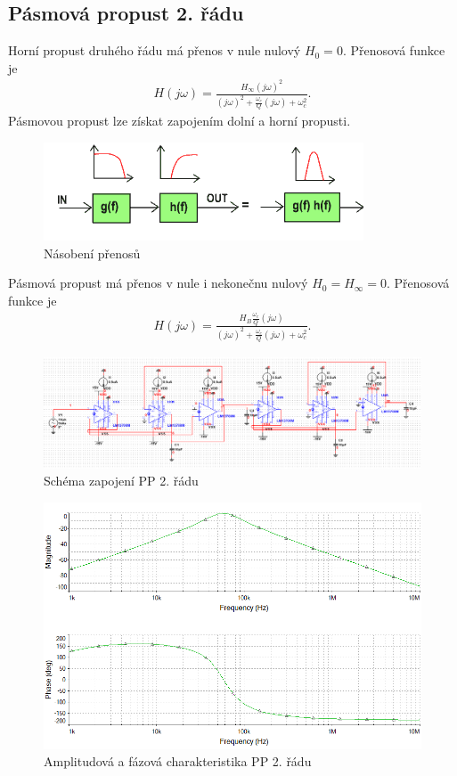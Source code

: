 \subsection{Pásmová propust 2. řádu}\label{s:PP2}
Horní propust druhého řádu má přenos v nule nulový $H_{0} = 0$. Přenosová funkce je
\begin{align}
H(j\omega) = \frac{H_{\infty} (j\omega) ^2}{(j\omega)^2 + \frac{\omega _c}{Q}(j\omega) + \omega _c ^2}.
\end{align}
\noindent Pásmovou propust lze získat zapojením dolní a horní propusti.
\begin{figure}[H]
\centering
\includegraphics[scale=0.9]{fig9.png}
\caption{Násobení přenosů \cite{13}}
\end{figure}
\noindent Pásmová propust má přenos v nule i nekonečnu nulový $H_{0} = H_{\infty} = 0$. Přenosová funkce je
\begin{align}
H(j\omega) = \frac{H_{B} \frac{\omega _c}{Q} (j\omega) }{(j\omega)^2 + \frac{\omega _c}{Q}(j\omega) + \omega _c ^2}.
\end{align}
\begin{figure}[H]
\centering
\includegraphics[scale=0.6]{PP2O.png}
\caption{Schéma zapojení PP 2. řádu}
\end{figure}
\begin{figure}[H]
\centering
\includegraphics[scale=0.6]{PP2O2.png}
\caption{Amplitudová a fázová charakteristika PP 2. řádu}
\end{figure}
